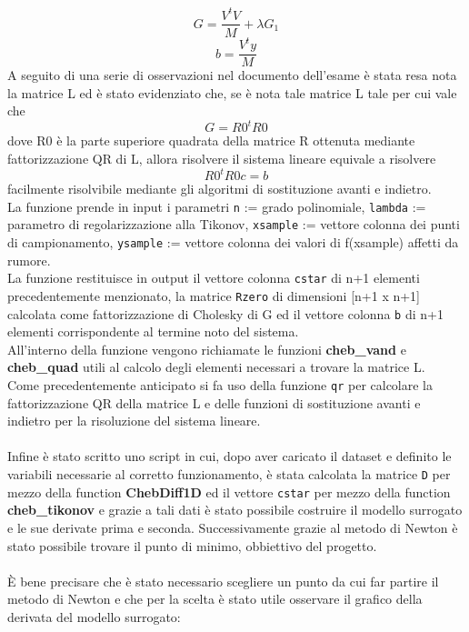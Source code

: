 \documentclass{article}
\begin{document}
\[G=\frac{V^{t}V}{M}+\lambda G_{1}\]
\[b=\frac{V^{t}y}{M}\]
A seguito di una serie di osservazioni nel documento dell'esame è stata resa nota la matrice L ed è stato evidenziato che, se è nota tale matrice L tale per cui vale che
\[G=R0^{t}R0\]
dove R0 è la parte superiore quadrata della matrice R ottenuta mediante fattorizzazione QR di L, allora risolvere il sistema lineare equivale a risolvere
\[R0^{t}R0c=b\]
facilmente risolvibile mediante gli algoritmi di sostituzione avanti e indietro.\\
La funzione prende in input i parametri \texttt{n} := grado polinomiale, \texttt{lambda} := parametro di regolarizzazione alla Tikonov, \texttt{xsample} := vettore colonna dei punti di campionamento, \texttt{ysample} := vettore colonna dei valori di f(xsample) affetti da rumore.\\
La funzione restituisce in output il vettore colonna \texttt{cstar} di n+1 elementi precedentemente menzionato, la matrice \texttt{Rzero} di dimensioni [n+1 x n+1] calcolata come fattorizzazione di Cholesky di G ed il vettore colonna \texttt{b} di n+1 elementi corrispondente al termine noto del sistema.\\
All'interno della funzione vengono richiamate le funzioni \textbf{cheb\_vand} e \textbf{cheb\_quad} utili al calcolo degli elementi necessari a trovare la matrice L.\\
Come precedentemente anticipato si fa uso della funzione \texttt{qr} per calcolare la fattorizzazione QR della matrice L e delle funzioni di sostituzione avanti e indietro per la risoluzione del sistema lineare.\\\\
Infine è stato scritto uno script in cui, dopo aver caricato il dataset e definito le variabili necessarie al corretto funzionamento, è stata calcolata la matrice \texttt{D} per mezzo della function \textbf{ChebDiff1D} ed il vettore \texttt{cstar} per mezzo della function \textbf{cheb\_tikonov} e grazie a tali dati è stato possibile costruire il modello surrogato e le sue derivate prima e seconda. Successivamente grazie al metodo di Newton è stato possibile trovare il punto di minimo, obbiettivo del progetto.\\\\
È bene precisare che è stato necessario scegliere un punto da cui far partire il metodo di Newton e che per la scelta è stato utile osservare il grafico della derivata del modello surrogato:
\end{document}

